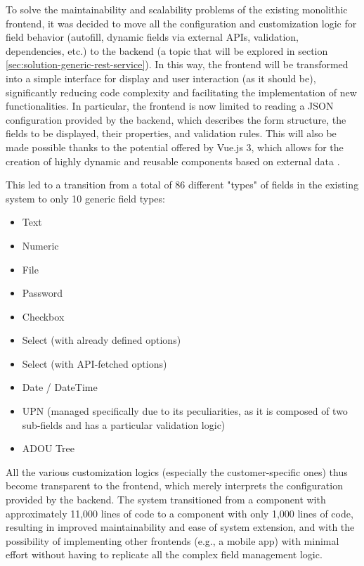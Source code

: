 To solve the maintainability and scalability problems of the existing monolithic frontend, it was decided to move all the configuration and customization logic for field behavior (autofill, dynamic fields via external APIs, validation, dependencies, etc.) to the backend (a topic that will be explored in section \ref{sec:solution-generic-rest-service}).
In this way, the frontend will be transformed into a simple interface for display and user interaction (as it should be), significantly reducing code complexity and facilitating the implementation of new functionalities.
In particular, the frontend is now limited to reading a JSON configuration provided by the backend, which describes the form structure, the fields to be displayed, their properties, and validation rules.
This will also be made possible thanks to the potential offered by Vue.js 3, which allows for the creation of highly dynamic and reusable components based on external data \cite{vue3}.

This led to a transition from a total of 86 different "types" of fields in the existing system to only 10 generic field types:
\begin{itemize}
    \item Text
    \item Numeric
    \item File
    \item Password
    \item Checkbox
    \item Select (with already defined options)
    \item Select (with API-fetched options)
    \item Date / DateTime
    \item UPN (managed specifically due to its peculiarities, as it is composed of two sub-fields and has a particular validation logic)
    \item ADOU Tree
\end{itemize}

All the various customization logics (especially the customer-specific ones) thus become transparent to the frontend, which merely interprets the configuration provided by the backend.
The system transitioned from a component with approximately 11,000 lines of code to a component with only 1,000 lines of code, resulting in improved maintainability and ease of system extension, and with the possibility of implementing other frontends (e.g., a mobile app) with minimal effort without having to replicate all the complex field management logic.


